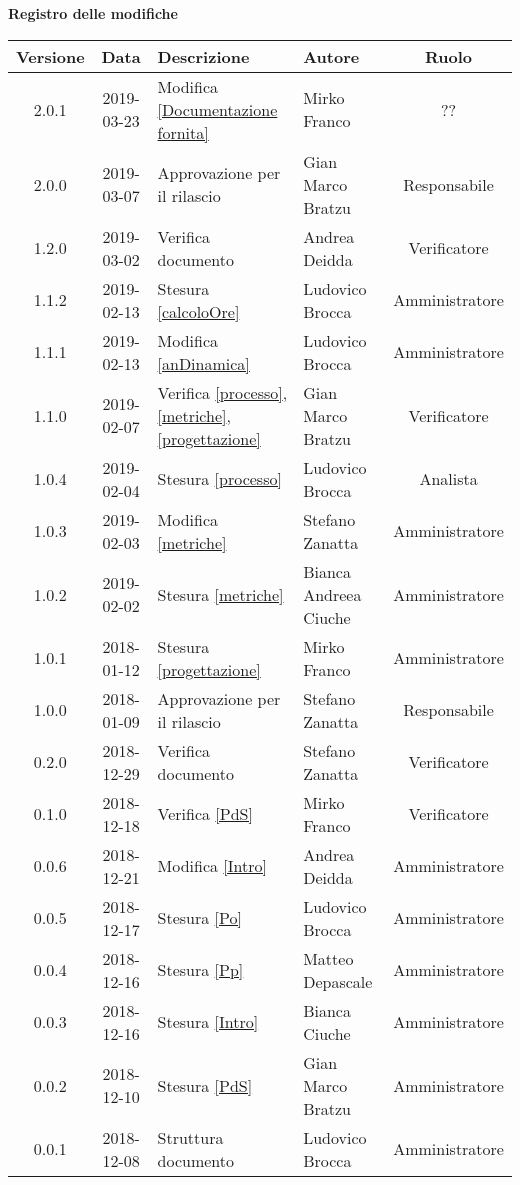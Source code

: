 \begin{center}
	\textbf{Registro delle modifiche}
	\end{center}
	\begin{center}
		\begin{tabularx}{\textwidth}{|c|c|X|X|c|}
			\hline
			\textbf{Versione} & \textbf{Data} & \textbf{Descrizione} & \textbf{Autore} & \textbf{Ruolo} \\ 
			\hline
			2.0.1 & 2019-03-23 & Modifica \ref{Documentazione fornita} & Mirko Franco & ?? \\
			\hline
			2.0.0 &2019-03-07 & Approvazione per il rilascio & Gian Marco Bratzu& Responsabile\\
			\hline
			1.2.0 &2019-03-02 & Verifica documento &Andrea Deidda& Verificatore\\
			\hline
			1.1.2 &2019-02-13 &Stesura \ref{calcoloOre} &Ludovico Brocca& Amministratore\\
			\hline
			1.1.1 &2019-02-13 &Modifica \ref{anDinamica} &Ludovico Brocca& Amministratore\\
			\hline
			1.1.0 &2019-02-07 &Verifica \ref{processo}, \ref{metriche}, \ref{progettazione} &Gian Marco Bratzu& Verificatore\\
			\hline
			1.0.4 &2019-02-04&Stesura \ref{processo}&Ludovico Brocca& Analista\\
			\hline
			1.0.3 & 2019-02-03 & Modifica \ref{metriche} & Stefano Zanatta & Amministratore\\
			\hline
			1.0.2 & 2019-02-02 & Stesura \ref{metriche} & Bianca Andreea Ciuche & Amministratore\\
			\hline
			1.0.1 & 2018-01-12 & Stesura \ref{progettazione} & Mirko Franco & Amministratore \\
			\hline
			1.0.0 & 2018-01-09 & Approvazione per il rilascio & Stefano Zanatta & Responsabile\\
			\hline
			0.2.0 & 2018-12-29 & Verifica documento & Stefano Zanatta & Verificatore\\
			\hline
			0.1.0 & 2018-12-18 & Verifica \ref{PdS} & Mirko Franco & Verificatore\\
			\hline
			0.0.6 & 2018-12-21 & Modifica \ref{Intro} & Andrea Deidda & Amministratore\\
			\hline
			0.0.5 & 2018-12-17 & Stesura \ref{Po} & Ludovico Brocca & Amministratore\\
			\hline
			0.0.4 & 2018-12-16 & Stesura \ref{Pp} & Matteo Depascale & Amministratore\\
			\hline
			0.0.3 & 2018-12-16 & Stesura \ref{Intro} & Bianca Ciuche & Amministratore\\
			\hline
			0.0.2 & 2018-12-10 & Stesura \ref{PdS} & Gian Marco Bratzu & Amministratore\\	
			\hline
			0.0.1 & 2018-12-08 & Struttura documento  & Ludovico Brocca & Amministratore\\
			\hline
	\end{tabularx}
	\end{center}

\newpage